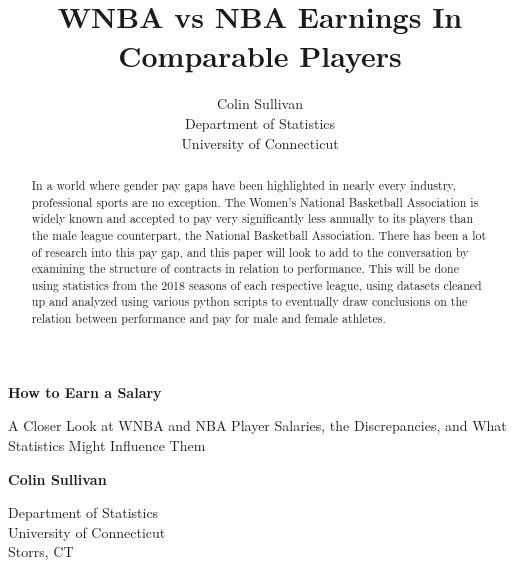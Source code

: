 \documentclass[12pt]{article}
\title{WNBA vs NBA Earnings In Comparable Players}
\author{Colin Sullivan\\
  Department of Statistics\\
  University of Connecticut
}
\begin{document}
   \begin{center}
       \vspace*{1cm}
       \Huge
       \textbf{How to Earn a Salary}

       \Large
       \vspace{0.5cm}
        A Closer Look at WNBA and NBA Player Salaries, the Discrepancies, and What Statistics Might Influence Them
            
       \vspace{1.5cm}

       \textbf{Colin Sullivan}
       
       \vfill


       \vfill
            
            
       \vspace{0.8cm}
     
         
        \Large    
       Department of Statistics\\
       University of Connecticut\\
       Storrs, CT\\
            
   \end{center}
\newpage

\begin{abstract}
In a world where gender pay gaps have been highlighted in nearly every industry, professional sports are no exception. The Women’s National Basketball Association is widely known and accepted to pay very significantly less annually to its players than the male league counterpart, the National Basketball Association. There has been a lot of research into this pay gap, and this paper will look to add to the conversation by examining the structure of contracts in relation to performance. This will be done using statistics from the 2018 seasons of each respective league, using datasets cleaned up and analyzed using various python scripts to eventually draw conclusions on the relation between performance and pay for male and female athletes.	
\end{abstract}
\end{document}
